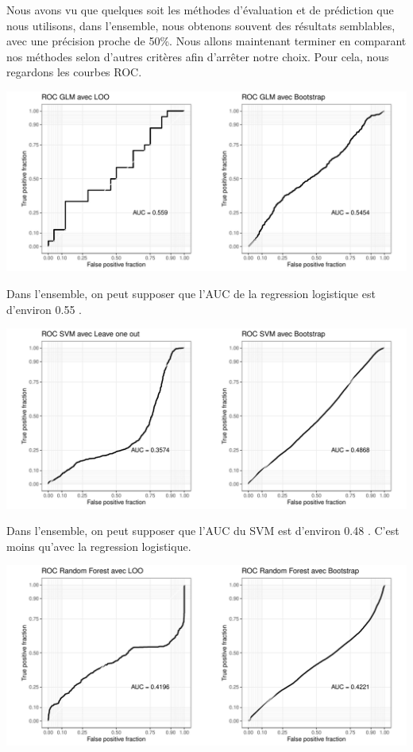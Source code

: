 \documentclass[]{article}
\begin{document}
Nous avons vu que quelques soit les méthodes d'évaluation et de
prédiction que nous utilisons, dans l'ensemble, nous obtenons souvent
des résultats semblables, avec une précision proche de 50\%. Nous allons
maintenant terminer en comparant nos méthodes selon d'autres critères
afin d'arrêter notre choix. Pour cela, nous regardons les courbes ROC.

\includegraphics{repport_projet_files/figure-latex/unnamed-chunk-55-1.pdf}

Dans l'ensemble, on peut supposer que l'AUC de la regression logistique
est d'environ 0.55 .

\includegraphics{repport_projet_files/figure-latex/unnamed-chunk-56-1.pdf}

Dans l'ensemble, on peut supposer que l'AUC du SVM est d'environ 0.48 .
C'est moins qu'avec la regression logistique.

\includegraphics{repport_projet_files/figure-latex/unnamed-chunk-57-1.pdf}
\end{document}
